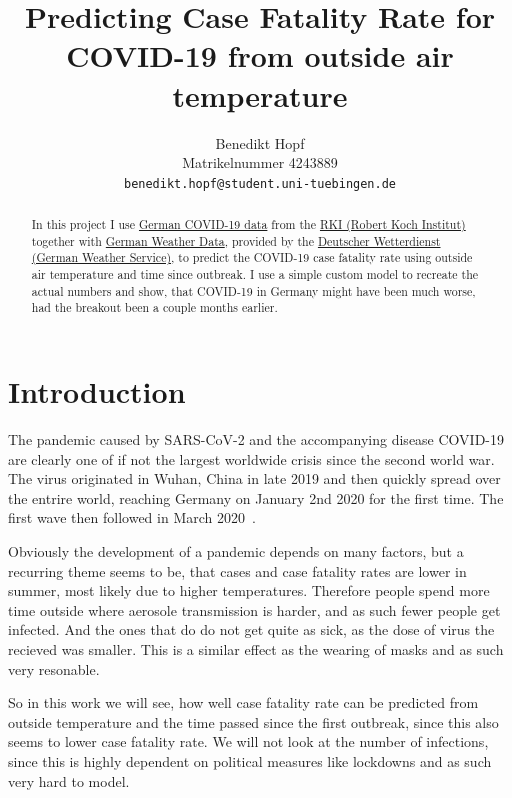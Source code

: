 \documentclass{article}
\title{Predicting Case Fatality Rate for COVID-19 from outside air temperature}
\author{%
  Benedikt Hopf\\
  Matrikelnummer 4243889\\
  \texttt{benedikt.hopf@student.uni-tuebingen.de} \\
}
\begin{document}
\maketitle

\begin{abstract}

  In this project I use \href{https://www.arcgis.com/sharing/rest/content/items/f10774f1c63e40168479a1feb6c7ca74/data}{German COVID-19 data} from the \href{https://www.rki.de/DE/Home/homepage_node.html}{RKI (Robert Koch Institut)} together with \href{https://opendata.dwd.de/climate_environment/CDC/observations_germany/climate/hourly/air_temperature/}{German Weather Data}, provided by the \href{https://www.dwd.de/DE/Home/home_node.html}{Deutscher Wetterdienst (German Weather Service)}, to predict the COVID-19 case fatality rate using outside air temperature and time since outbreak. I use a simple custom model to recreate the actual numbers and show, that COVID-19 in Germany might have been much worse, had the breakout been a couple months earlier.

\end{abstract}

\section{Introduction}
\label{sec:introduction}

The pandemic caused by SARS-CoV-2 and the accompanying disease COVID-19 are clearly one of if not the largest worldwide crisis since the second world war. The virus originated in Wuhan, China in late 2019 and then quickly spread over the entrire world, reaching Germany on January 2nd 2020 for the first time. The first wave then followed in March 2020~\cite{rki_2022}.  

Obviously the development of a pandemic depends on many factors, but a recurring theme seems to be, that cases and case fatality rates are lower in summer, most likely due to higher temperatures. Therefore people spend more time outside where aerosole transmission is harder, and as such fewer people get infected. And the ones that do do not get quite as sick, as the dose of virus the recieved was smaller. This is a similar effect as the wearing of masks and as such very resonable.

So in this work we will see, how well case fatality rate can be predicted from outside temperature and the time passed since the first outbreak, since this also seems to lower case fatality rate. We will not look at the number of infections, since this is highly dependent on political measures like lockdowns and as such very hard to model. 
\end{document}
